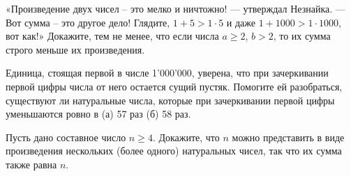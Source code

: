 ﻿
\begin{itemize}

\itA «Произведение двух чисел – это мелко и ничтожно! — утверждал Незнайка.
— Вот сумма – это другое дело! Глядите, $1+5 > 1 \cdot 5$ и даже
$1+1000 > 1 \cdot 1000$, вот как!» Докажите, тем не менее, что если
числа $a \ge 2$, $b > 2$, то их сумма строго меньше их произведения.

\itB Единица, стоящая первой в числе 1'000'000, уверена, что при зачеркивании первой цифры числа от него остается сущий пустяк. Помогите ей разобраться, существуют ли натуральные числа, которые при зачеркивании первой цифры уменьшаются ровно в (а) 57 раз (б) 58 раз.

\itC Пусть дано составное число $n \geq 4$. Докажите, что $n$ можно представить в виде произведения нескольких (более одного) натуральных чисел, так что их сумма также равна $n$.
\end{itemize}